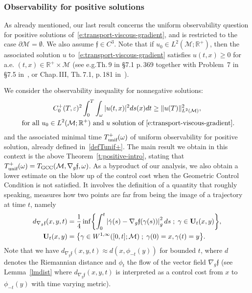 \documentclass[10pt]{amsart}
\newcommand{\GCC}{\textup{GCC}}
\newcommand{\unif}{\textup{unif}}
\newcommand{\sep}{\;;\;}
\theoremstyle{definition}
\newcommand{\M}{\ensuremath{\mathcal M}}
\newcommand{\mb}[1]{\ensuremath{\mathbb{#1}}}
\newcommand{\R}{{\mb{R}}}
\newcommand{\f}{\ensuremath{\mathfrak{f}}}
\let\d\partial
\let\eps\varepsilon
\providecommand{\eg}{e.g.}\providecommand{\ie}{i.e.}\providecommand{\etc}{etc.}
\begin{document}
\subsubsection{Observability for positive solutions}
As already mentioned, our last result concerns the uniform observability question for positive solutions of~\eqref{e:transport-viscous-gradient}, and is restricted to the case $\d\M=\emptyset$. We also assume $\f\in C^3$.
Note that if $u_0 \in L^2(\M; \R^+)$, then the associated solution $u$ to~\eqref{e:transport-viscous-gradient} satisfies $u(t,x) \geq 0$ for a.e. $(t,x) \in \R^+\times\M$ (see \eg Th.\,9 in \S7.1 p.\,369 together with Problem~7 in \S 7.5 in~\cite{Evans:98}, or Chap.\,III, Th.\,7.1, p.\,181 in~\cite{LSU:68}).

We consider the observability inequality for nonnegative solutions:
\begin{multline}
\label{e:transport-viscous-obsplus}
C_0^+(T,\eps)^2 \int_0^T\int_\omega |u(t,x)|^2 ds(x)dt \geq \|u (T)\|_{L^2(\M)}^2, \\
\text{ for all } u_0 \in L^2(\M; \R^+)\text{ and } u \text{ solution of~\eqref{e:transport-viscous-gradient}}.
\end{multline}
and the associated minimal time $T_{\unif}^+(\omega)$ of uniform observability for positive solution, already defined in~\eqref{defTunif+}. The main result we obtain in this context is the above Theorem~\ref{t:positive-intro}, stating that $T_{\unif}^+(\omega)=T_{\GCC}(\M, \nabla_g\f,\omega)$.
As a byproduct of our analysis, we also obtain a lower estimate on the blow up of the control cost when the Geometric Control Condition is not satisfied. It involves the definition of a quantity that roughly speaking, measures how two points are far from being the image of a trajectory at time $t$, namely
\begin{align}
\label{defdXintro} d_{\nabla_g\f}(x,y,t)&=\frac{1}{4} \inf \biggl\{ \int_0^t \left|\dot{\gamma}(s)-\nabla_g \f(\gamma(s))\right|_g^{2} ds\sep \gamma \in \mathbf{U}_t(x,y)
\biggr\}, \\
\mathbf{U}_t(x,y) & = \bigl\{\gamma \in W^{1,\infty} ([0,t] ; \M )\sep\gamma(0)=x, \gamma(t)= y \bigr\}. \notag
\end{align}
Note that we have $ d_{\nabla_g\f}(x,y,t)\approx d(x,\phi_{-t}(y))$ for bounded $t$, where $d$ denotes the Riemannian distance and $\phi_t$ the flow of the vector field $\nabla_g \f$ (see Lemma~\ref{lmdist} where $d_{\nabla_g\f}(x,y,t)$ is interpreted as a control cost from $x$ to $\phi_{-t}(y)$ with time varying metric).
\end{document}
